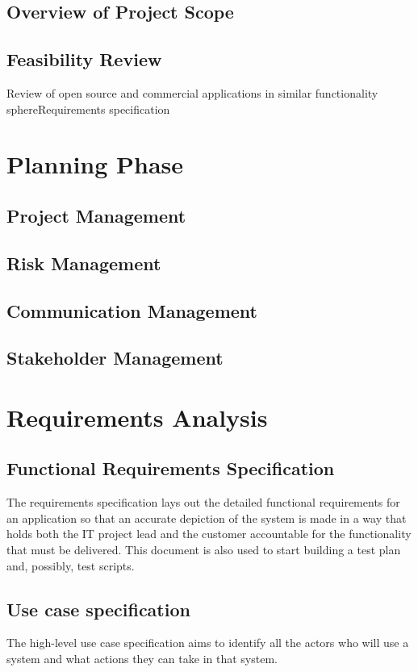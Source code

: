 \documentclass[a4paper,12pt]{article}
\begin{document}
\subsection {Overview of Project Scope}
\subsection {Feasibility Review}
Review of open source and commercial applications in similar functionality sphereRequirements specification

\section {Planning Phase}

\subsection {Project Management}
\subsection {Risk Management}
\subsection {Communication Management}
\subsection {Stakeholder Management}
\section {Requirements Analysis}

\subsection {Functional Requirements Specification}

The requirements specification lays out the detailed functional requirements for an application so that an
accurate depiction of the system is made in a way that holds both the IT project lead and the customer accountable for the functionality that must be delivered.  This document is also used to start building a test plan and, possibly, test scripts.

\subsection {Use case specification}
The high-level use case specification aims to identify all the actors who will use a system and what
actions they can take in that system.
\end{document}
